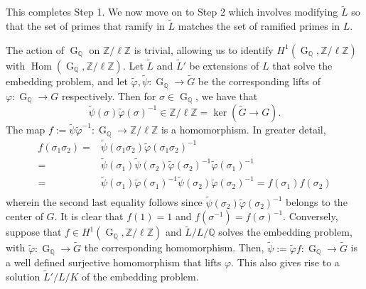 \documentclass[11pt,reqno]{amsart}
\newcommand{\Z}{\mathbb{Z}}
\newcommand{\Q}{\mathbb{Q}}
\newcommand{\op}[1]{\operatorname{#1}}
\numberwithin{equation}{section}
\begin{document}
This completes Step 1. We now move on to Step 2 which involves modifying $\widetilde{L}$ so that the set of primes that ramify in $\widetilde{L}$ matches the set of ramified primes in $L$.\\

\par The action of \(\op{G}_{\Q}\) on \(\Z/\ell\Z\) is trivial, allowing us to identify \(H^1(\op{G}_{\Q}, \Z/\ell\Z)\) with \(\op{Hom}(\op{G}_{\Q}, \Z/\ell\Z)\). Let \(\widetilde{L}\) and \(\widetilde{L}'\) be extensions of \(L\) that solve the embedding problem, and let \(\widetilde{\varphi}, \widetilde{\psi}: \op{G}_{\Q} \to \widetilde{G}\) be the corresponding lifts of \(\varphi: \op{G}_{\Q} \to G\) respectively. Then for $\sigma\in \op{G}_\Q$, we have that \[\widetilde{\psi}(\sigma)\widetilde{\varphi}(\sigma)^{-1}\in \Z/\ell\Z=\op{ker}(\widetilde{G}\rightarrow G).\] The map $f:=\widetilde{\psi}\widetilde{\varphi}^{-1}:\op{G}_\Q\rightarrow \Z/\ell\Z$ is a homomorphism. In greater detail, 
\[\begin{split}
f(\sigma_1\sigma_2)=&\widetilde{\psi}(\sigma_1\sigma_2)\widetilde{\varphi}(\sigma_1\sigma_2)^{-1} \\ = & \widetilde{\psi}(\sigma_1)\widetilde{\psi}(\sigma_2)\widetilde{\varphi}(\sigma_2)^{-1}\widetilde{\varphi}(\sigma_1)^{-1}\\
=& \widetilde{\psi}(\sigma_1) \widetilde{\varphi}(\sigma_1)^{-1}\widetilde{\psi}(\sigma_2)\widetilde{\varphi}(\sigma_2)^{-1}=f(\sigma_1)f(\sigma_2)\\
\end{split}\]
wherein the second last equality follows since $\widetilde{\psi}(\sigma_2)\widetilde{\varphi}(\sigma_2)^{-1}$ belongs to the center of $G$. It is clear that $f(1)=1$ and $f(\sigma^{-1})=f(\sigma)^{-1}$. Conversely, suppose that $f\in H^1(\op{G}_\Q, \Z/\ell\Z)$ and $\widetilde{L}/L/\Q$ solves the embedding problem, with $\widetilde{\varphi}:\op{G}_\Q\rightarrow \widetilde{G}$ the corresponding homomorphism. Then, $\widetilde{\psi}:=\widetilde{\varphi} f:\op{G}_\Q\rightarrow \widetilde{G}$ is a well defined surjective homomorphism that lifts $\varphi$. This also gives rise to a solution $\widetilde{L}'/L/K$ of the embedding problem.
\end{document}
